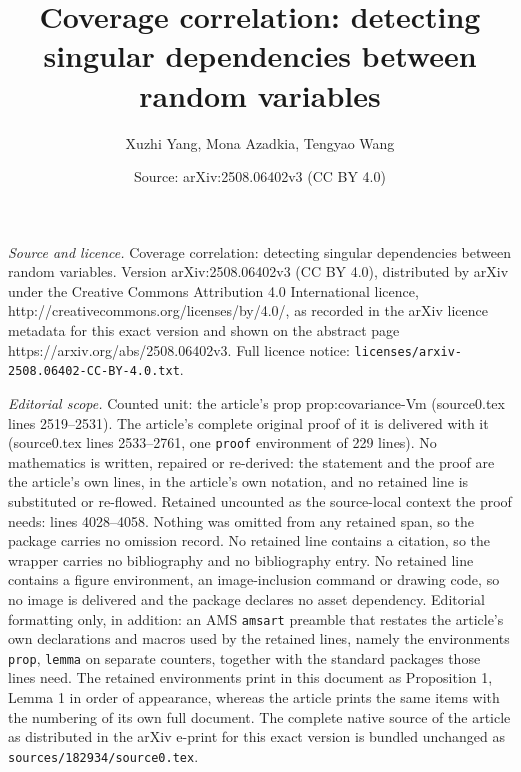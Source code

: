 \documentclass[10pt,a4paper]{amsart}
\title{Coverage correlation: detecting singular dependencies between random variables}
\author{Xuzhi Yang, Mona Azadkia, Tengyao Wang}
\date{Source: arXiv:2508.06402v3 (CC BY 4.0)}
\begin{document}
\maketitle

\noindent\emph{Source and licence.} Coverage correlation: detecting singular dependencies between random variables. Version arXiv:2508.06402v3 (CC BY 4.0), distributed by arXiv under the Creative Commons Attribution 4.0 International licence, http://creativecommons.org/licenses/by/4.0/, as recorded in the arXiv licence metadata for this exact version and shown on the abstract page https://arxiv.org/abs/2508.06402v3. Full licence notice: \texttt{licenses/arxiv-2508.06402-CC-BY-4.0.txt}.\par\smallskip

\noindent\textit{Editorial scope.} Counted unit: the article's prop prop:covariance-Vm (source0.tex lines 2519--2531). The article's complete original proof of it is delivered with it (source0.tex lines 2533--2761, one \texttt{proof} environment of 229 lines). No mathematics is written, repaired or re-derived: the statement and the proof are the article's own lines, in the article's own notation, and no retained line is substituted or re-flowed.  Retained uncounted as the source-local context the proof needs: lines 4028--4058.  Nothing was omitted from any retained span, so the package carries no omission record.  No retained line contains a citation, so the wrapper carries no bibliography and no bibliography entry.  No retained line contains a figure environment, an image-inclusion command or drawing code, so no image is delivered and the package declares no asset dependency.  Editorial formatting only, in addition: an AMS \texttt{amsart} preamble that restates the article's own declarations and macros used by the retained lines, namely the environments \texttt{prop}, \texttt{lemma} on separate counters, together with the standard packages those lines need.  The retained environments print in this document as Proposition 1, Lemma 1 in order of appearance, whereas the article prints the same items with the numbering of its own full document.  The complete native source of the article as distributed in the arXiv e-print for this exact version is bundled unchanged as \texttt{sources/182934/source0.tex}.
\end{document}
